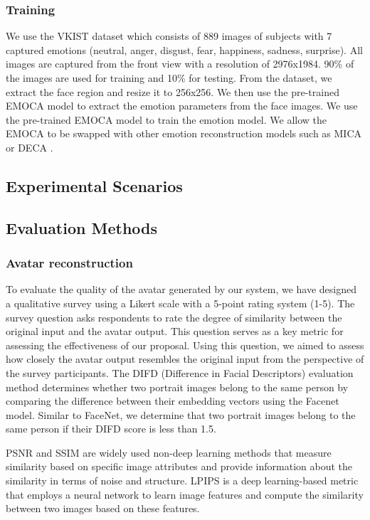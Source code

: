 \subsubsection{Training}
We use the VKIST dataset which consists of 889 images of subjects with 7 captured emotions (neutral, anger, disgust, fear, happiness, sadness, surprise). All images are captured from the front view with a resolution of 2976x1984. 90\% of the images are used for training and 10\% for testing. From the dataset, we extract the face region and resize it to 256x256. We then use the pre-trained EMOCA model to extract the emotion parameters from the face images.
We use the pre-trained EMOCA model to train the emotion model. We allow the EMOCA to be swapped with other emotion reconstruction models such as MICA \cite{zielonkaMetricalReconstructionHuman2022} or DECA \cite{fengLearningAnimatableDetailed2021}.
\subsection{Experimental Scenarios}


\subsection{Evaluation Methods}
\subsubsection{Avatar reconstruction}
To evaluate the quality of the avatar generated by our system, we have designed a qualitative survey using a Likert scale with a 5-point rating system (1-5). The survey question asks respondents to rate the degree of similarity between the original input and the avatar output. This question serves as a key metric for assessing the effectiveness of our proposal.
Using this question, we aimed to assess how closely the avatar output resembles the original input from the perspective of the survey participants.
The DIFD (Difference in Facial Descriptors) evaluation method determines whether two portrait images belong to the same person by comparing the difference between their embedding vectors using the Facenet model. Similar to FaceNet, we determine that two portrait images belong to the same person if their DIFD score is less than 1.5.

PSNR and SSIM are widely used non-deep learning methods that measure similarity based on specific image attributes and provide information about the similarity in terms of noise and structure.
LPIPS is a deep learning-based metric that employs a neural network to learn image features and compute the similarity between two images based on these features.

